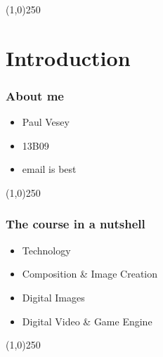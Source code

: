 %


\lstset{language=HTML,
				basicstyle=\small,
				breaklines=true,
        numbers=left,
        numberstyle=\tiny,
        showstringspaces=false,
        aboveskip=-20pt,
        frame=leftline
        }



\tableofcontents
\newpage



\begin{frame}
\titlepage
\end{frame}\begin{center}\line(1,0){250}\end{center}
%
%


\section{Introduction}




\begin{frame}
\frametitle{About me}
\begin{itemize}
	\item Paul Vesey
	\item 13B09
	\item email is best
\end{itemize}

\end{frame}
\begin{center}\line(1,0){250}\end{center}







\begin{frame}
\frametitle{The course in a nutshell}
\begin{itemize}
	\item Technology
	\item Composition \& Image Creation
	\item Digital Images
	\item Digital Video \& Game Engine
\end{itemize}
\end{frame}\begin{center}\line(1,0){250}\end{center}


